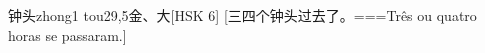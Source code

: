 \begin{EntryWithPhonetic}{钟头}{zhong1 tou2}{9,5}{⾦、⼤}[HSK 6]
  [三四个钟头过去了。===Três ou quatro horas se passaram.]
\end{EntryWithPhonetic}


